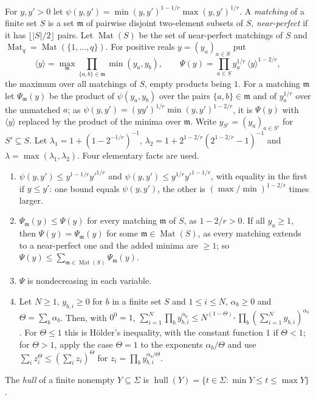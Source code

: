 \documentclass[11pt]{amsart}
\theoremstyle{definition}
\theoremstyle{remark}
\numberwithin{equation}{section}
\newcommand{\abs}[1]{\lvert #1\rvert}
\theoremstyle{plain}
\theoremstyle{definition}
\theoremstyle{plain}
\begin{document}
For $y,y'>0$ let $\psi(y,y')=\min(y,y')^{1-1/r}\max(y,y')^{1/r}$. A \emph{matching} of a finite set $S$ is a set
$\mathfrak m$ of pairwise disjoint two-element subsets of $S$, \emph{near-perfect} if it has $\lfloor\abs S/2\rfloor$
pairs. Let $\operatorname{Mat}(S)$ be the set of near-perfect matchings of $S$ and
$\operatorname{Mat}_q=\operatorname{Mat}(\{1,\dots,q\})$. For positive reals $y=(y_a)_{a\in S}$ put
\[
 \langle y\rangle=\max_{\mathfrak m}\prod_{\{a,b\}\in\mathfrak m}\min(y_a,y_b),\qquad
 \Psi(y)=\prod_{a\in S}y_a^{1/r}\,\langle y\rangle^{1-2/r},
\]
the maximum over all matchings of $S$, empty products being $1$. For a matching $\mathfrak m$ let
$\Psi_{\mathfrak m}(y)$ be the product of $\psi(y_a,y_b)$ over the pairs $\{a,b\}\in\mathfrak m$ and of $y_a^{1/r}$ over
the unmatched $a$; as $\psi(y,y')=(yy')^{1/r}\min(y,y')^{1-2/r}$, it is $\Psi(y)$ with $\langle y\rangle$ replaced by the
product of the minima over $\mathfrak m$. Write $y_{S'}=(y_a)_{a\in S'}$ for $S'\subseteq S$. Let
$\lambda_1=1+(1-2^{-1/r})^{-1}$, $\lambda_2=1+2^{1-2/r}(2^{1-2/r}-1)^{-1}$ and $\lambda=\max(\lambda_1,\lambda_2)$. Four
elementary facts are used.
\begin{enumerate}
\item[(F1)] $\psi(y,y')\le y^{1-1/r}y'^{1/r}$ and $\psi(y,y')\le y^{1/r}y'^{1-1/r}$, with equality in the first if
$y\le y'$: one bound equals $\psi(y,y')$, the other is $(\max/\min)^{1-2/r}$ times larger.
\item[(F2)] $\Psi_{\mathfrak m}(y)\le\Psi(y)$ for every matching $\mathfrak m$ of $S$, as $1-2/r>0$. If all $y_a\ge1$, then
$\Psi(y)=\Psi_{\mathfrak m}(y)$ for some $\mathfrak m\in\operatorname{Mat}(S)$, as every matching extends to a
near-perfect one and the added minima are $\ge1$; so $\Psi(y)\le\sum_{\mathfrak m\in\operatorname{Mat}(S)}\Psi_{\mathfrak m}(y)$.
\item[(F3)] $\Psi$ is nondecreasing in each variable.
\item[(F4)] Let $N\ge1$, $y_{b,i}\ge0$ for $b$ in a finite set $S$ and $1\le i\le N$, $\alpha_b\ge0$ and
$\Theta=\sum_b\alpha_b$. Then, with $0^0=1$,
$\sum_{i=1}^N\prod_by_{b,i}^{\alpha_b}\le N^{(1-\Theta)_+}\prod_b(\sum_{i=1}^Ny_{b,i})^{\alpha_b}$. For $\Theta\le1$ this
is H\"older's inequality, with the constant function $1$ if $\Theta<1$; for $\Theta>1$, apply the case $\Theta=1$ to
the exponents $\alpha_b/\Theta$ and use $\sum_iz_i^\Theta\le(\sum_iz_i)^\Theta$ for $z_i=\prod_by_{b,i}^{\alpha_b/\Theta}$.
\end{enumerate}
The \emph{hull} of a finite nonempty $Y\subseteq\Sigma$ is $\operatorname{hull}(Y)=\{t\in\Sigma:\min Y\le t\le\max Y\}$.
\end{document}
